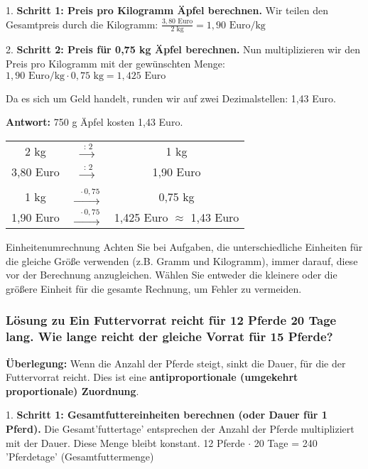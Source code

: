 \begin{loesungsumgebung}[loes:2.3]{}
1.  \textbf{Schritt 1: Preis pro Kilogramm Äpfel berechnen.}
    Wir teilen den Gesamtpreis durch die Kilogramm:
    $\frac{3,80 \text{ Euro}}{2 \text{ kg}} = 1,90 \text{ Euro/kg}$

2.  \textbf{Schritt 2: Preis für 0,75 kg Äpfel berechnen.}
    Nun multiplizieren wir den Preis pro Kilogramm mit der gewünschten Menge:
    $1,90 \text{ Euro/kg} \cdot 0,75 \text{ kg} = 1,425 \text{ Euro}$

    Da es sich um Geld handelt, runden wir auf zwei Dezimalstellen: 1,43 Euro.

\textbf{Antwort:} 750 g Äpfel kosten 1,43 Euro.

\begin{center}
\begin{tabular}{c c c}
    2 kg & $\xrightarrow{\text{ : } 2}$ & 1 kg \\
    3,80 Euro & $\xrightarrow{\text{ : } 2}$ & 1,90 Euro \\
    \quad \\
    1 kg & $\xrightarrow{\text{ } \cdot 0,75}$ & 0,75 kg \\
    1,90 Euro & $\xrightarrow{\text{ } \cdot 0,75}$ & 1,425 Euro $\approx$ 1,43 Euro \\
\end{tabular}
\end{center}
\begin{tippumgebung}{Einheitenumrechnung}
Achten Sie bei Aufgaben, die unterschiedliche Einheiten für die gleiche Größe verwenden (z.B. Gramm und Kilogramm), immer darauf, diese vor der Berechnung anzugleichen. Wählen Sie entweder die kleinere oder die größere Einheit für die gesamte Rechnung, um Fehler zu vermeiden.
\end{tippumgebung}

\subsubsection*{Lösung zu Ein Futtervorrat reicht für 12 Pferde 20 Tage lang. Wie lange reicht der gleiche Vorrat für 15 Pferde?}

\textbf{Überlegung:} Wenn die Anzahl der Pferde steigt, sinkt die Dauer, für die der Futtervorrat reicht. Dies ist eine \textbf{antiproportionale (umgekehrt proportionale) Zuordnung}.

1.  \textbf{Schritt 1: Gesamtfuttereinheiten berechnen (oder Dauer für 1 Pferd).}
    Die Gesamt'futtertage' entsprechen der Anzahl der Pferde multipliziert mit der Dauer. Diese Menge bleibt konstant.
    12 Pferde $\cdot$ 20 Tage = 240 'Pferdetage' (Gesamtfuttermenge)


\end{loesungsumgebung}
